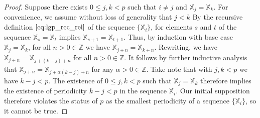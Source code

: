 \documentclass{article}
\theoremstyle{break}
\begin{document}
\begin{proof}
Suppose there exists $0 \leq j,k < p$ such that $i \neq j$ and $\mathbb{X}_j = \mathbb{X}_k$. For convenience, we assume without loss of generality that $j < k$ By the recursive definition $\ref{eq:lgp_rec_rel}$ of the sequence $\{\mathbb{X}_i\}$, for elements $s$ and $t$ of the sequence $\mathbb{X}_{s} = \mathbb{X}_{t}$ implies $\mathbb{X}_{s+1} = \mathbb{X}_{t+1}$. Thus, by induction with base case $\mathbb{X}_j = \mathbb{X}_k$, for all $n > 0 \in \mathbb{Z}$ we have $\mathbb{X}_{j+n} = \mathbb{X}_{k+n}$. Rewriting, we have $\mathbb{X}_{j+n} = \mathbb{X}_{j+(k-j)+n}$ for all $n > 0 \in \mathbb{Z}$. It follows by further inductive analysis that $\mathbb{X}_{j+n} = \mathbb{X}_{j+\alpha(k-j)+n}$ for any $\alpha > 0 \in \mathbb{Z}$. Take note that with $j,k < p$ we have $k - j < p$. The existence of $0 \leq j,k < p$ such that $\mathbb{X}_j = \mathbb{X}_k$ therefore implies the existence of periodicity $k - j < p$ in the sequence $\mathbb{X}_i$. Our initial supposition therefore violates the status of $p$ as the smallest periodicity of a sequence $\{\mathbb{X}_i\}$, so it cannot be true.
\end{proof}
\end{document}
